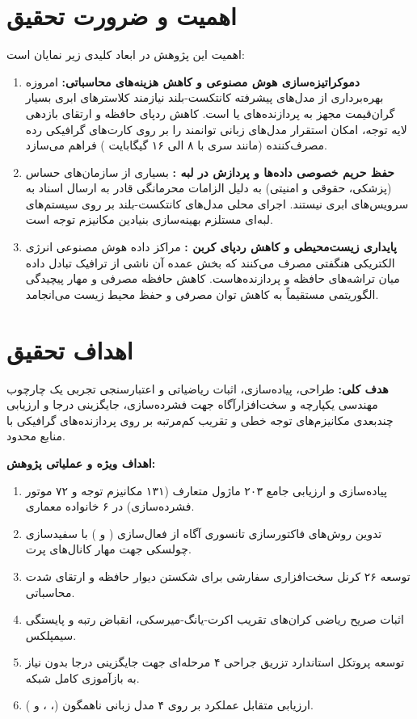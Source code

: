 \documentclass[12pt,a4paper]{report}
\theoremstyle{definition}
\begin{document}
\section{اهمیت و ضرورت تحقیق}
اهمیت این پژوهش در ابعاد کلیدی زیر نمایان است:
\begin{enumerate}
    \item \textbf{دموکراتیزه‌سازی هوش مصنوعی و کاهش هزینه‌های محاسباتی:}
    امروزه بهره‌برداری از مدل‌های پیشرفته کانتکست-بلند نیازمند کلاسترهای ابری بسیار گران‌قیمت مجهز به پردازنده‌های  یا  است. کاهش ردپای حافظه و ارتقای بازدهی لایه توجه، امکان استقرار مدل‌های زبانی توانمند را بر روی کارت‌های گرافیکی رده مصرف‌کننده (مانند سری  با ۸ الی ۱۶ گیگابایت ) فراهم می‌سازد.
    \item \textbf{حفظ حریم خصوصی داده‌ها و پردازش در لبه :}
    بسیاری از سازمان‌های حساس (پزشکی، حقوقی و امنیتی) به دلیل الزامات محرمانگی قادر به ارسال اسناد به سرویس‌های ابری نیستند. اجرای محلی مدل‌های کانتکست-بلند بر روی سیستم‌های لبه‌ای مستلزم بهینه‌سازی بنیادین مکانیزم توجه است.
    \item \textbf{پایداری زیست‌محیطی و کاهش ردپای کربن :}
    مراکز داده هوش مصنوعی انرژی الکتریکی هنگفتی مصرف می‌کنند که بخش عمده آن ناشی از ترافیک تبادل داده میان تراشه‌های حافظه و پردازنده‌هاست. کاهش حافظه مصرفی و مهار پیچیدگی الگوریتمی مستقیماً به کاهش توان مصرفی و حفظ محیط زیست می‌انجامد.
\end{enumerate}

\section{اهداف تحقیق}
\textbf{هدف کلی:}
طراحی، پیاده‌سازی، اثبات ریاضیاتی و اعتبارسنجی تجربی یک چارچوب مهندسی یکپارچه و سخت‌افزارآگاه جهت فشرده‌سازی، جایگزینی درجا  و ارزیابی چندبعدی مکانیزم‌های توجه خطی و تقریب کم‌مرتبه  بر روی پردازنده‌های گرافیکی با منابع محدود.

\textbf{اهداف ویژه و عملیاتی پژوهش:}
\begin{enumerate}
    \item پیاده‌سازی و ارزیابی جامع ۲۰۳ ماژول متعارف (۱۳۱ مکانیزم توجه و ۷۲ موتور فشرده‌سازی) در ۶ خانواده معماری.
    \item تدوین روش‌های فاکتورسازی تانسوری آگاه از فعال‌سازی ( و ) با سفیدسازی چولسکی جهت مهار کانال‌های پرت.
    \item توسعه ۲۶ کرنل سخت‌افزاری سفارشی  برای شکستن دیوار حافظه و ارتقای شدت محاسباتی.
    \item اثبات صریح ریاضی کران‌های تقریب اکرت-یانگ-میرسکی، انقباض رتبه و پایستگی سیمپلکس.
    \item توسعه پروتکل استاندارد تزریق جراحی ۴ مرحله‌ای جهت جایگزینی درجا بدون نیاز به بازآموزی کامل شبکه.
    \item ارزیابی متقابل عملکرد بر روی ۴ مدل زبانی ناهمگون (، ،  و ).
\end{enumerate}
\end{document}
